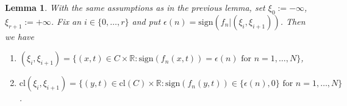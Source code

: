 \documentclass[12pt]{article}
\theoremstyle{mythm}
\newtheorem{lemma}{Lemma}[section]
\begin{document}
\begin{lemma}
With the same assumptions as in the previous lemma, set \(\xi_0 := -\infty\),  
\(\xi_{r+1} := +\infty\). Fix an \(i \in \{0, \ldots, r\}\) and put \(\epsilon(n) = \mathrm{sign}(f_n|(\xi_i, \xi_{i+1}))\). Then we have  

\begin{enumerate}
    \item[(a)] \((\xi_i, \xi_{i+1}) = \{(x, t) \in C \times \mathbb{R}: \mathrm{sign}(f_n(x, t)) = \epsilon(n) \text{ for } n = 1, \ldots, N\}\),
    
    \item[(b)] \(\mathrm{cl}(\xi_i, \xi_{i+1}) = \{(y, t) \in \mathrm{cl}(C) \times \mathbb{R}: \mathrm{sign}(f_n(y, t)) \in \{\epsilon(n), 0\} \text{ for } n = 1, \ldots, N\}\).
\end{enumerate}
\end{lemma}
\end{document}
